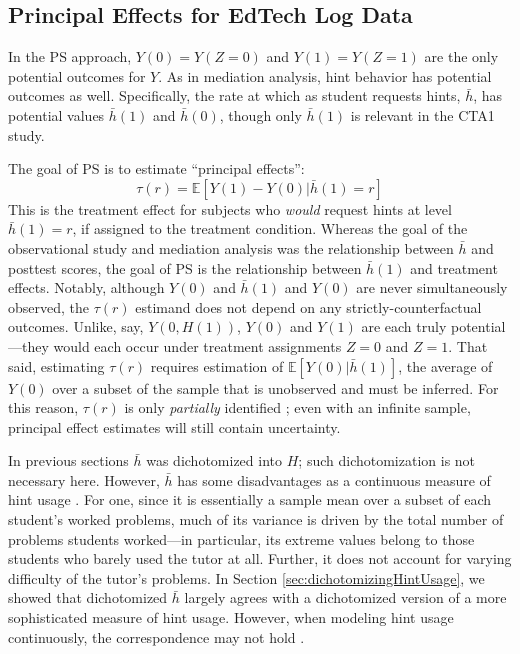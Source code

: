 \documentclass{article}\usepackage[]{graphicx}\usepackage[]{color}
\newcommand{\EE}{\mathbb{E}}
\begin{document}
\subsection{Principal Effects for EdTech Log Data}\label{sec:psIntro}
In the PS approach, $Y(0)=Y(Z=0)$ and $Y(1)=Y(Z=1)$ are the only potential
outcomes for $Y$.
As in mediation analysis, hint behavior has potential outcomes as
well.
Specifically, the rate at which as student requests hints, $\bar{h}$,
has potential values $\bar{h}(1)$ and $\bar{h}(0)$,
though only $\bar{h}(1)$ is relevant in the CTA1 study.

The goal of PS is to estimate ``principal
effects'':
\begin{equation*}
\tau(r)=\EE[Y(1)-Y(0)|\bar{h}(1)=r]
\end{equation*}
This is the treatment effect for subjects who \emph{would} request
hints at level $\bar{h}(1)=r$, if assigned to the treatment condition.
Whereas the goal of the observational study and mediation
analysis was the relationship between $\bar{h}$ and posttest scores, the
goal of PS is the relationship between $\bar{h}(1)$ and treatment effects.
Notably, although $Y(0)$ and $\bar{h}(1)$ and $Y(0)$ are never
simultaneously observed, the $\tau(r)$ estimand does not depend on any
strictly-counterfactual outcomes.
Unlike, say, $Y(0,H(1))$, $Y(0)$ and $Y(1)$ are each truly
potential---they would each occur under treatment assignments $Z=0$
and $Z=1$.
That said, estimating $\tau(r)$ requires estimation of
$\EE[Y(0)|\bar{h}(1)]$, the average of $Y(0)$ over a subset of the
sample that is unobserved and must be inferred.
For this reason, $\tau(r)$ is only \emph{partially} identified
\citep[e.g.][]{mealli2016identification}; even with an infinite
sample, principal effect estimates will still contain uncertainty.

In previous sections $\bar{h}$ was dichotomized into $H$; such
dichotomization is not necessary here.
However, $\bar{h}$ has some disadvantages as a continuous measure of
hint usage \citep{aoas}.
For one, since it is essentially a sample mean over a subset of each student's
worked problems, much of its variance is driven by the total number of
problems students worked---in particular, its extreme values belong to
those students who barely used the tutor at all.
Further, it does not account for varying difficulty of the tutor's
problems.
In Section \ref{sec:dichotomizingHintUsage}, we showed that
dichotomized $\bar{h}$ largely agrees with a dichotomized version of a
more sophisticated measure of hint usage.
However, when modeling hint usage continuously, the correspondence may
not hold \citep[see][for a more complete discussion]{aoas}.
\end{document}
